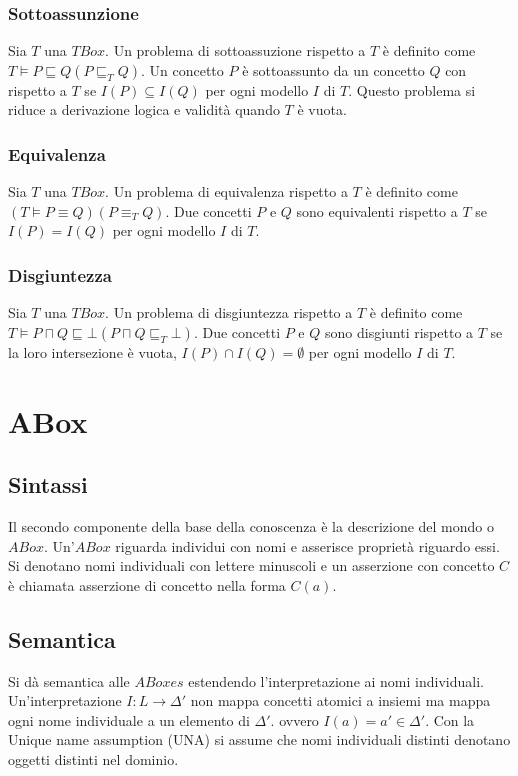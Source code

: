 \subsubsection{Sottoassunzione}
Sia $T$ una $TBox$. Un problema di sottoassuzione rispetto a $T$ \`e definito come $T\models P\sqsubseteq Q(P\sqsubseteq_T Q)$. Un concetto $P$ \`e sottoassunto da un concetto $Q$ con rispetto a $T$
se $I(P)\subseteq I(Q)$ per ogni modello $I$ di $T$. Questo problema si riduce a derivazione logica e validit\`a quando $T$ \`e vuota.
\subsubsection{Equivalenza}
Sia $T$ una $TBox$. Un problema di equivalenza rispetto a $T$ \`e definito come $(T\models P\equiv Q)(P\equiv_T Q)$. Due concetti $P$ e $Q$ sono equivalenti rispetto a $T$ se $I(P)=I(Q)$ per ogni 
modello $I$ di $T$.
\subsubsection{Disgiuntezza}
Sia $T$ una $TBox$. Un problema di disgiuntezza rispetto a $T$ \`e definito come $T\models P\sqcap Q\sqsubseteq \bot(P\sqcap Q\sqsubseteq_T\bot)$. Due concetti $P$ e $Q$ sono disgiunti rispetto a 
$T$ se la loro intersezione \`e vuota, $I(P)\cap I(Q)=\emptyset$ per ogni modello $I$ di $T$.
\section{ABox}
\subsection{Sintassi}
Il secondo componente della base della conoscenza \`e la descrizione del mondo o $ABox$. Un'$ABox$ riguarda individui con nomi e asserisce propriet\`a riguardo essi. Si denotano nomi individuali con lettere
minuscoli e un asserzione con concetto $C$ \`e chiamata asserzione di concetto nella forma $C(a)$.
\subsection{Semantica}
Si d\`a semantica alle $ABoxes$ estendendo l'interpretazione ai nomi individuali. Un'interpretazione $I:L\rightarrow\Delta'$ non mappa concetti atomici a insiemi ma mappa ogni nome individuale a un 
elemento di $\Delta'$. ovvero $I(a)=a'\in\Delta'$. Con la Unique name assumption (UNA) si assume che nomi individuali distinti denotano oggetti distinti nel dominio. 
